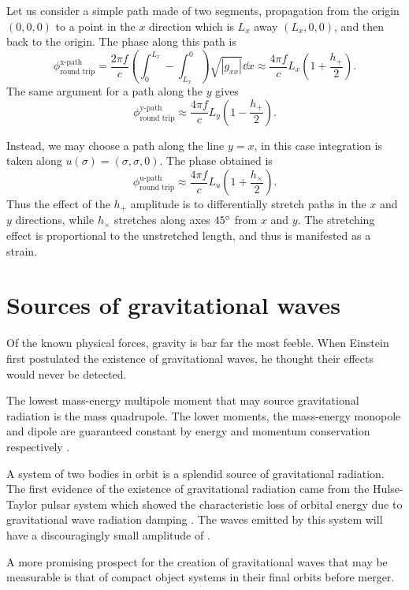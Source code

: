 Let us consider a simple path made of two segments, propagation from the origin $(0,0,0)$ to a point in the $x$ direction which is $L_x$ away $(L_x,0,0)$, and then back to the origin. %
The phase along this path is
\begin{equation}
\phi_{\text{round trip}}^{\text{x-path}}= \frac{2\pi f}{c} \left(\int_0^{L_x}-\int^0_{L_x}\right)\sqrt{|g_{xx}|}\dd x \approx \frac{4\pi f}{c} L_x \left(1+\frac{h_+}{2}\right).
\end{equation} 
The same argument for a path along the $y$ gives
\begin{equation}
\phi_{\text{round trip}}^{\text{y-path}} \approx \frac{4\pi f}{c} L_y \left(1-\frac{h_+}{2}\right).
\end{equation} 

Instead, we may choose a path along the line $y=x$, in this case integration is taken along $ u(\sigma) = (\sigma,\sigma,0)$. %
The phase obtained is
\begin{equation}
\phi_{\text{round trip}}^{\text{u-path}} \approx \frac{4\pi f}{c} L_u \left(1+\frac{h_\times}{2}\right).
\end{equation} 
Thus the effect of the $h_+$ amplitude is to differentially stretch paths in the $x$ and $y$ directions, while $h_\times$ stretches along axes $45 ^\circ$ from $x$ and $y$. %
 The stretching effect is proportional to the unstretched length, and thus is manifested as a strain.
\section{Sources of gravitational waves}
Of the known physical forces, gravity is bar far the most feeble. %
When Einstein first postulated the existence of gravitational waves, he thought their effects would never be detected.

The lowest mass-energy multipole moment that may source gravitational radiation is the mass quadrupole. %
The lower moments, the mass-energy monopole and dipole are guaranteed constant by energy and momentum conservation respectively .

A system of two bodies in orbit is a splendid source of gravitational radiation. %
The first evidence of the existence of gravitational radiation came from the Hulse-Taylor pulsar system which showed the characteristic loss of orbital energy due to gravitational wave radiation damping . %
The waves emitted by this system will have a discouragingly small amplitude of . %


A more promising prospect for the creation of gravitational waves that may be measurable is that of compact object systems in their final orbits before merger. %



